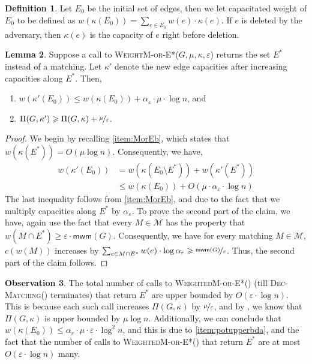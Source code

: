 \documentclass[a4paper,11pt]{article}
\newcommand{\eps}{\varepsilon}
\theoremstyle{definition}
\newtheorem{definition2}{Definition}
\theoremstyle{definition}
\theoremstyle{definition}
\theoremstyle{definition}
\theoremstyle{definition}
\newtheorem{lemma2}[definition2]{Lemma}
\theoremstyle{definition}
\theoremstyle{definition}
\newtheorem{observation2}[definition2]{Observation}
\theoremstyle{definition}
\theoremstyle{definition}
\theoremstyle{definition}
\theoremstyle{definition}
\theoremstyle{definition}
\theoremstyle{definition}
\theoremstyle{definition}
\theoremstyle{definition}
\begin{document}
\begin{definition2}
Let $E_0$ be the initial set of edges, then we let capacitated weight of $E_0$ to be defined as $w(\kappa(E_0))=\sum_{e\in E_0}w(e)\cdot \kappa(e)$. If $e$ is deleted by the adversary, then $\kappa(e)$ is the capacity of $e$ right before deletion.
\end{definition2}

\begin{lemma2}\label{lem:potupperbd}
Suppose a call to \textsc{WeightM-or-E*}($G,\mu,\kappa, \eps$) returns the set $E^*$ instead of a matching. Let $\kappa'$ denote the new edge capacities after increasing capacities along $E^*$. Then,
\begin{enumerate}
\item $w(\kappa'(E_0))\leqslant w(\kappa(E_0))+\alpha_{\eps}\cdot \mu\cdot \log n$, and \label{item:potupperbda}
\item $\Pi(G,\kappa')\geqslant \Pi(G,\kappa)+\nicefrac{\mu}{\eps}$.
\end{enumerate}
\end{lemma2}
\begin{proof}
We begin by recalling \ref{item:MorEb}, which states that $w(\kappa(E^*))=O(\mu\log n)$. Consequently, we have,
\begin{align*}
w(\kappa'(E_0))&=w(\kappa(E_0\setminus E^*))+w(\kappa'(E^*))\\
		    &\leqslant w(\kappa(E_0))+O(\mu\cdot \alpha_{\eps}\cdot \log n)
\end{align*}
The last inequality follows from \ref{item:MorEb}, and due to the fact that we multiply capacities along $E^*$ by $\alpha_{\eps}$. To prove the second part of the claim, we have, again use the fact that every $M\in \mathcal{M}$ has the property that $w(M\cap E^*)\geqslant \eps\cdot \textsf{mwm}(G)$. Consequently, we have for every matching $M\in \mathcal{M}$, $c(w(M))$ increases by $\sum_{e\in M\cap E^*}w(e)\cdot \log \alpha_{\eps}\geqslant \nicefrac{\textsf{mwm}(G)}{\eps}$. Thus, the second part of the claim follows. 
\end{proof}

\begin{observation2}\label{obs:calltype1}
The total number of calls to \textsc{WeightedM-or-E*}() (till \textsc{Dec-Matching}() terminates) that return $E^*$ are upper bounded by $O(\eps\cdot \log n)$. This is because each such call increases $\Pi(G,\kappa)$ by $\nicefrac{\mu}{\eps}$, and by , we know that $\Pi(G,\kappa)$ is upper bounded by $\mu\log n$. Additionally, we can conclude that $w(\kappa(E_0))\leqslant \alpha_{\eps}\cdot \mu\cdot \eps\cdot \log ^2n$, and this is due to \ref{item:potupperbda}, and the fact that the number of calls to \textsc{WeightedM-or-E*}() that return $E^*$ are at most $O(\eps\cdot \log n)$ many. 
\end{observation2}
\end{document}
